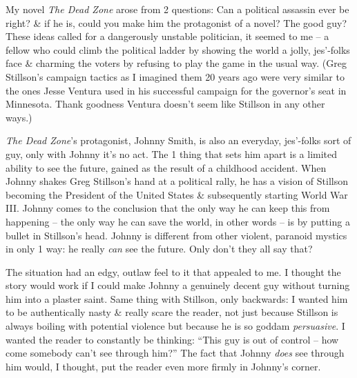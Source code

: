 \documentclass{article}
\numberwithin{equation}{section}
\begin{document}
My novel \textit{The Dead Zone} arose from 2 questions: Can a political assassin ever be right? \& if he is, could you make him the protagonist of a novel? The good guy? These ideas called for a dangerously unstable politician, it seemed to me -- a fellow who could climb the political ladder by showing the world a jolly, jes'-folks face \& charming the voters by refusing to play the game in the usual way. (Greg Stillson's campaign tactics as I imagined them 20 years ago were very similar to the ones Jesse Ventura used in his successful campaign for the governor's seat in Minnesota. Thank goodness Ventura doesn't seem like Stillson in any other ways.)

\textit{The Dead Zone}'s protagonist, Johnny Smith, is also an everyday, jes'-folks sort of guy, only with Johnny it's no act. The 1 thing that sets him apart is a limited ability to see the future, gained as the result of a childhood accident. When Johnny shakes Greg Stillson's hand at a political rally, he has a vision of Stillson becoming the President of the United States \& subsequently starting World War III. Johnny comes to the conclusion that the only way he can keep this from happening -- the only way he can save the world, in other words -- is by putting a bullet in Stillson's head. Johnny is different from other violent, paranoid mystics in only 1 way: he really \textit{can} see the future. Only don't they all say that?

The situation had an edgy, outlaw feel to it that appealed to me. I thought the story would work if I could make Johnny a genuinely decent guy without turning him into a plaster saint. Same thing with Stillson, only backwards: I wanted him to be authentically nasty \& really scare the reader, not just because Stillson is always boiling with potential violence but because he is so goddam \textit{persuasive}. I wanted the reader to constantly be thinking: ``This guy is out of control -- how come somebody can't see through him?'' The fact that Johnny \textit{does} see through him would, I thought, put the reader even more firmly in Johnny's corner.
\end{document}
